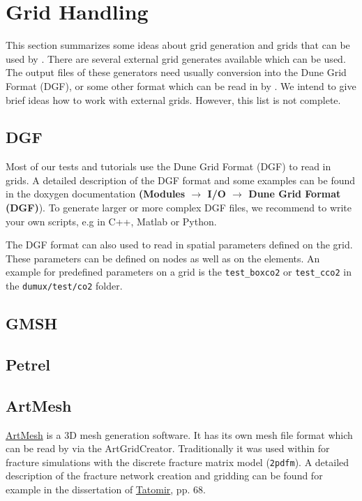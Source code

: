 \section{Grid Handling}
\label{sec:gridhandling}

This section summarizes some ideas about grid generation and grids that can be used by \Dumux. There are
several external grid generates available which can be used. The output files of these generators need
usually conversion into the Dune Grid Format (DGF), or some other format which can be read in by \Dune.
We intend to give brief ideas how to work with external grids. However, this list is not complete.

\subsection{DGF}
Most of our \Dumux tests and tutorials use the Dune Grid Format (DGF) to read in grids. A detailed description
of the DGF format and some examples can be found in the \Dune doxygen documentation
\textbf{(Modules $\rightarrow$ I/O $\rightarrow$ Dune Grid Format (DGF)}). To generate larger or more
complex DGF files, we recommend to write your own scripts, e.g in C++, Matlab or Python.

The DGF format can also used to read in spatial parameters defined on the grid. These parameters can
be defined on nodes as well as on the elements. An example for predefined parameters on a grid is
the \texttt{test\_boxco2} or \texttt{test\_cco2} in the  \texttt{dumux/test/co2} folder.



\subsection{GMSH}


\subsection{Petrel}


\subsection{ArtMesh}
\href{http://www.topologica.org/toplog/wp/}{ArtMesh} is a 3D mesh generation software. It has its own mesh file format
which can be read by \Dumux via the ArtGridCreator. Traditionally it was used within \Dumux for fracture simulations with
the discrete fracture matrix model (\texttt{2pdfm}). A detailed description of the fracture network creation and gridding
can be found for example in the dissertation of \href{http://elib.uni
-stuttgart.de/opus/frontdoor.php?source_opus=8047&la=de}{Tatomir}, pp. 68.


